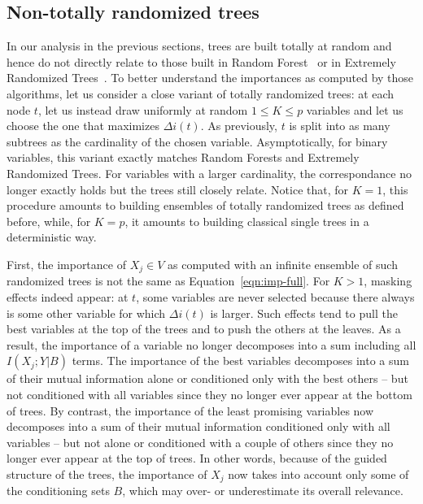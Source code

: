 
\subsection{Non-totally randomized trees}
\label{sec:ntrt}

In our analysis in the previous sections, trees are built totally at random and
hence do not directly relate to those built in Random
Forest~\citep{breiman:2001} or in Extremely Randomized
Trees~\citep{geurts:2006}. To better understand the importances as computed by
those algorithms,  let us consider a close variant of totally randomized trees:
at each node $t$, let us instead draw uniformly at random $1 \leq K \leq p$
variables  and let us choose the one that maximizes $\Delta i(t)$. As
previously, $t$ is split into as many subtrees as the cardinality of the chosen
variable. Asymptotically, for binary variables, this variant exactly matches
Random Forests and Extremely Randomized Trees. For variables with a larger
cardinality, the correspondance no longer exactly holds but the trees still
closely relate. Notice that, for $K=1$, this procedure amounts to building
ensembles of  totally randomized trees as defined before, while, for $K=p$, it
amounts to building classical single trees in a deterministic way.

First, the importance of  $X_j \in V$ as computed with an infinite ensemble of
such randomized trees is not the same as Equation~\ref{eqn:imp-full}. For $K>1$,
masking effects indeed appear: at $t$, some variables are never selected
because there always is some other variable for which $\Delta i(t)$ is larger.
Such effects tend to pull the best variables  at the top of the trees and to
push the others at the leaves.  As a result, the importance of a variable no
longer decomposes into a sum including all $I(X_j;Y|B)$ terms. The
importance of the best variables decomposes into a sum of their mutual
information alone or conditioned only with the best others -- but not
conditioned with all variables since they no longer ever appear at the bottom of
trees. By contrast, the importance of the least promising variables now
decomposes into a sum of their mutual information conditioned only with all
variables -- but not alone or conditioned with a couple of others since they no
longer ever appear at the top of trees. In other words, because of the guided
structure of the trees, the importance of $X_j$ now takes into account only some
of the conditioning sets $B$, which may over- or underestimate its overall
relevance.

